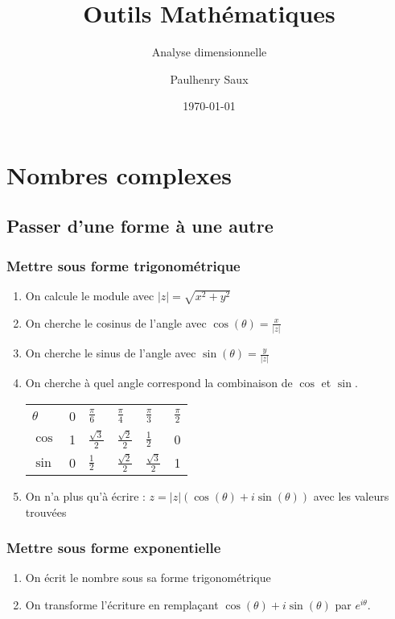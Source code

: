 \documentclass[french]{yLectureNote}
\title{Outils Mathématiques}
\subtitle{Analyse dimensionnelle}
\author{Paulhenry Saux}
\date{\today}
\begin{document}
\setcounter{chapter}{5}
\chapter{Nombres complexes}
\section{Passer d'une forme à une autre}
\subsection{Mettre sous forme trigonométrique}
\begin{enumerate}
 \item On calcule le module avec $|z| = \sqrt{x^2+y^2}$
 \item On cherche le cosinus de l'angle avec $\cos(\theta) = \frac{x}{|z|}$
 \item On cherche le sinus de l'angle avec $\sin(\theta) = \frac{y}{|z|}$
 \item On cherche à quel angle correspond la combinaison de $\cos$ et $\sin$.

\begin{tabular}{llllll}
$\theta$ & 0 & $\frac{\pi}{6}$ & $\frac{\pi}{4}$ & $\frac{\pi}{3}$ & $\frac{\pi}{2}$\\
$\cos$ & 1 & $\frac{\sqrt{3}}{2}$ & $\frac{\sqrt{2}}{2}$ & $\frac{1}{2}$ & 0\\
$\sin$ & 0 & $\frac{1}{2}$ & $\frac{\sqrt{2}}{2}$ & $\frac{\sqrt{3}}{2}$ & 1
\end{tabular}
\item On n'a plus qu'à écrire : $z = |z|(\cos(\theta) + i\sin(\theta))$ avec les valeurs trouvées
\end{enumerate}
\subsection{Mettre sous forme exponentielle}
\begin{enumerate}
 \item On écrit le nombre sous sa forme trigonométrique
 \item On transforme l'écriture en remplaçant $\cos(\theta)+i\sin(\theta)$ par $e^{i\theta}$.
\end{enumerate}
\end{document}
